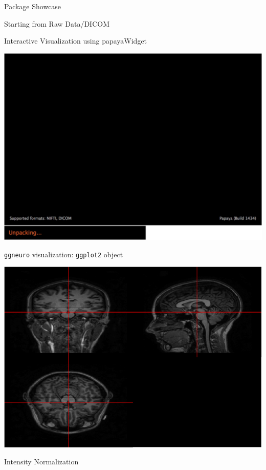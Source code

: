 \documentclass[ignorenonframetext,]{beamer}
\begin{document}
\begin{frame}[fragile]{Package Showcase}
\begin{block}{Starting from Raw Data/DICOM}
\end{block}

\begin{block}{Interactive Visualization using papayaWidget}

\includegraphics{index_files/figure-beamer/unnamed-chunk-16-1.pdf}

\end{block}

\begin{block}{\texttt{ggneuro} visualization: \texttt{ggplot2} object}

\includegraphics{index_files/figure-beamer/unnamed-chunk-17-1.pdf}

\end{block}

\begin{block}{Intensity Normalization}


\end{block}
\end{frame}
\end{document}

